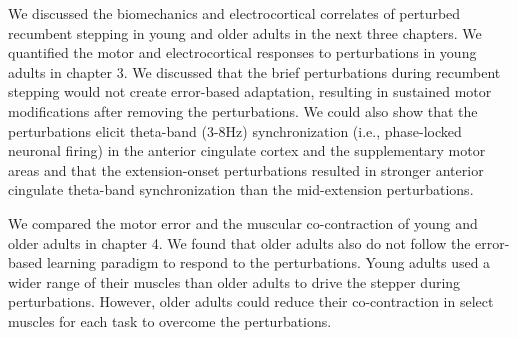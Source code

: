 \documentclass[../thesis_seyed.tex]{subfiles}
\begin{document}
We discussed the biomechanics and electrocortical correlates of perturbed recumbent stepping in young and older adults in the next three chapters. We quantified the motor and electrocortical responses to perturbations in young adults in chapter 3. We discussed that the brief perturbations during recumbent stepping would not create error-based adaptation, resulting in sustained motor modifications after removing the perturbations. We could also show that the perturbations elicit theta-band (3-8Hz) synchronization (i.e., phase-locked neuronal firing) in the anterior cingulate cortex and the supplementary motor areas and that the extension-onset perturbations resulted in stronger anterior cingulate theta-band synchronization than the mid-extension perturbations.

We compared the motor error and the muscular co-contraction of young and older adults in chapter 4. We found that older adults also do not follow the error-based learning paradigm to respond to the perturbations. Young adults used a wider range of their muscles than older adults to drive the stepper during perturbations. However, older adults could reduce their co-contraction in select muscles for each task to overcome the perturbations.




\end{document}
